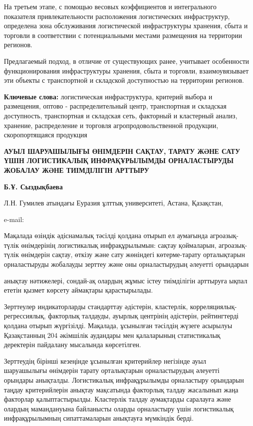 На третьем этапе, с помощью весовых коэффициентов и интегрального
показателя привлекательности расположения логистических инфраструктур,
определена зона обслуживания логистической инфраструктуры хранения,
сбыта и торговли в соответствии с потенциальными местами размещения на
территории регионов.

Предлагаемый подход, в отличие от существующих ранее, учитывает
особенности функционирования инфраструктуры хранения, сбыта и торговли,
взаимоувязывает эти объекты с транспортной и складской доступностью на
территории регионов.

{\bfseries Ключевые слова:} логистическая инфраструктура, критерий выбора и
размещения, оптово - распределительный центр, транспортная и складская
доступность, транспортная и складская сеть, факторный и кластерный
анализ, хранение, распределение и торговля агропродовольственной
продукции, скоропортящаяся продукция

\begin{articleheader}
{\bfseries АУЫЛ ШАРУАШЫЛЫҒЫ ӨНІМДЕРІН САҚТАУ, ТАРАТУ ЖӘНЕ САТУ ҮШІН
ЛОГИСТИКАЛЫҚ ИНФРАҚҰРЫЛЫМДЫ ОРНАЛАСТЫРУДЫ ЖОБАЛАУ ЖӘНЕ ТИІМДІЛІГІН
АРТТЫРУ}

{\bfseries Б.Ұ. Сыздықбаева}
\end{articleheader}

\begin{affiliation}
Л.Н. Гумилев атындағы Еуразия ұлттық университеті, Астана, Қазақстан,

e-mail: \href{mailto:bakyt_syzdykbaeva@mail.ru}{}
\end{affiliation}

Мақалада өзіндік әдіснамалық тәсілді қолдана отырып ел аумағында
агроазық-түлік өнімдерінің логистикалық инфрақұрылымын: сақтау
қоймаларын, агроазық-түлік өнімдерін сақтау, өткізу және сату жөніндегі
көтерме-тарату орталықтарын орналастыруды жобалауды зерттеу және оны
орналастырудың әлеуетті орындарын

анықтау нәтижелері, сондай-ақ олардың жұмыс істеу тиімділігін арттыруға
ықпал ететін қызмет көрсету аймақтары қарастырылады.

Зерттеулер индикаторларды стандарттау әдістерін, кластерлік,
корреляциялық-регрессиялық, факторлық талдауды, ауырлық центрінің
әдістерін, рейтингтерді қолдана отырып жүргізілді. Мақалада, ұсынылған
тәсілдің жүзеге асырылуы Қазақстанның 204 әкімшілік аудандары мен
қалаларының статистикалық деректерін пайдалану мысалында көрсетілген.

Зерттеудің бірінші кезеңінде ұсынылған критерийлер негізінде ауыл
шаруашылығы өнімдерін тарату орталықтарын орналастырудың әлеуетті
орындары анықталды. Логистикалық инфрақұрылымды орналастыру орындарын
таңдау критерийлерін анықтау мақсатында факторлық талдау жасалынып жаңа
факторлар қалыптастырылды. Кластерлік талдау аумақтарды саралауға және
олардың мамандануына байланысты оларды орналастыру үшін логистикалық
инфрақұрылымның сипаттамаларын анықтауға мүмкіндік берді.

